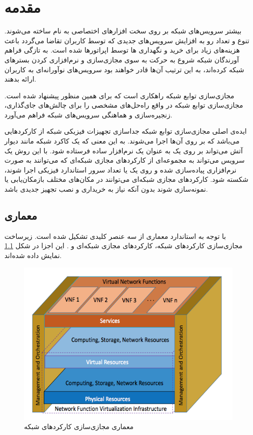 \chapter{مقدمه}


بیشتر سرویس‌های شبکه بر روی سخت افزارهای اختصاصی به نام
ساخته می‌شوند.
تنوع و تعداد رو به افزایش سرویس‌های جدیدی که توسط کاربران تقاضا می‌گردد
باعث هزینه‌های زیاد برای خرید و نگهداری
‌ها
توسط اپراتورها شده است.
به تازگی فراهم آورندگان شبکه
شروع به حرکت به سوی مجازی‌سازی و نرم‌افزاری کردن بسترهای شبکه کرده‌اند،
به این ترتیب آن‌ها قادر خواهند بود
سرویس‌های نوآورانه‌ای به کاربران ارائه بدهند.

مجازی‌سازی توابع شبکه‌ راهکاری است که برای همین منظور پیشنهاد شده است.
مجازی‌سازی توابع شبکه‌ در واقع راه‌حل‌های مشخصی را برای چالش‌های جای‌گذاری،
زنجیره‌سازی و هماهنگی سرویس‌های شبکه فراهم می‌آورد.

ایده‌ی اصلی مجازی‌سازی توابع شبکه جداسازی تجهیزات فیزیکی شبکه از کارکردهایی می‌باشد که
بر روی آن‌ها اجرا می‌شوند.
به این معنی که یک کاکرد شبکه مانند دیوار آتش می‌تواند بر روی یک
به عنوان یک نرم‌افزار ساده فرستاده شود.
با این روش یک سرویس می‌تواند به مجموعه‌ای از کارکردهای مجازی شبکه‌ای که می‌توانند به صورت نرم‌افزاری پیاده‌سازی شده
و روی یک یا تعداد سرور استاندارد فیزیکی اجرا شوند، شکسته شود.
کارکردهای مجازی شبکه‌ای می‌توانند در مکان‌های مختلف بازمکان‌یابی یا نمونه‌سازی شوند بدون آنکه
نیاز به خریداری و نصب تجهیز جدیدی باشد.
\cite{Mijumbi2016}

\section{معماری }
با توجه به استاندارد  معماری 
از سه عنصر کلیدی تشکیل شده است.
زیرساخت مجازی‌سازی کارکردهای شبکه،
کارکردهای مجازی شبکه‌ای و
.
این اجزا در شکل \cref{fig.1} نمایش داده شده‌اند.

\begin{figure}[!h]
\center\includegraphics[scale=.6]{images/nfv-arch}
\caption{معماری مجازی‌سازی کارکردهای شبکه
\cite{Mijumbi2016}
}\label{fig.1}
\end{figure}

